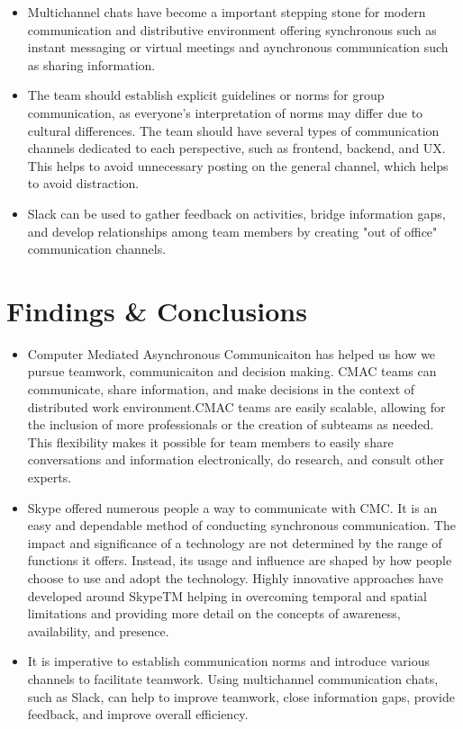 \documentclass{llncs}
\begin{document}
\begin{itemize}
    \item Multichannel chats have become a important stepping stone for modern communication and distributive environment offering synchronous such as instant messaging or virtual meetings and aynchronous communication such as sharing information.~\cite{refbook1}  \\
    \item The team should establish explicit guidelines or norms for group communication, as everyone's interpretation of norms may differ due to cultural differences. The team should have several types of communication channels dedicated to each perspective, such as frontend, backend, and UX. This helps to avoid unnecessary posting on the general channel, which helps to avoid distraction.~\cite{refpaper9} \\
    \item Slack can be used to gather feedback on activities, bridge information gaps, and develop relationships among team members by creating "out of office" communication channels.~\cite{refpaper9}
\end{itemize}


\section{Findings \& Conclusions}

\begin{itemize}
    \item Computer Mediated Asynchronous Communicaiton has helped us how we pursue teamwork, communicaiton and decision making. CMAC teams can communicate, share information, and make decisions in the context of distributed work environment.CMAC teams are easily scalable, allowing for the inclusion of more professionals or the creation of subteams as needed. This flexibility makes it possible for team members to easily share conversations and information electronically, do research, and consult other experts. ~\cite{refpaper6}\\
    \item Skype offered numerous people a way to communicate with CMC. It is an easy and dependable method of conducting synchronous communication. The impact and significance of a technology are not determined by the range of functions it offers. Instead, its usage and influence are shaped by how people choose to use and adopt the technology. Highly innovative approaches have developed around SkypeTM  helping in overcoming  temporal and spatial limitations and providing more detail on the concepts of awareness, availability, and presence.~\cite{refpaper9}\\
    \item It is imperative to establish communication norms and introduce various channels to facilitate teamwork. Using multichannel communication chats, such as Slack, can help to improve teamwork, close information gaps, provide feedback, and improve overall efficiency. ~\cite{refpaper9}

\end{itemize}
\end{document}
